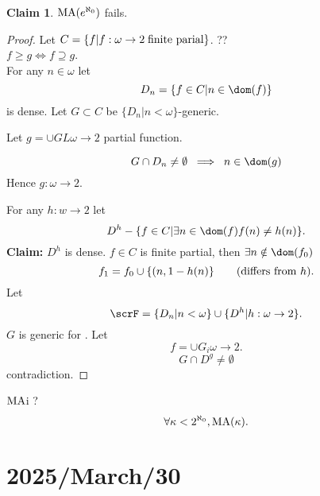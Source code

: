 \documentclass[11pt,pdftex,twoside,a4paper]{article}
\newcommand{\B}[1]{\textbf{#1}}
\newcommand{\MA}{\ensuremath{\mathop{\rm MA}\nolimits}}
\theoremstyle{definition}
\newtheorem{claim}[thm]{Claim}
\begin{document}
\begin{claim}
\(\MA(e^{\aleph_0})\) fails.
\end{claim}
\begin{proof}
Let \(C = \{f| f: \omega \to 2 \;\textnormal{finite parial}\}\). ??
\\
\(f \geq g \iff f \supseteq g\).
\\
For any \(n\in \omega\) let
\begin{equation*}
D_n = \{f\in C| n \in\dom(f)\}
\end{equation*}
is dense.
Let \(G \subset C\)  be  \(\{D_n|n < \omega\}\)-generic.

Let \(g = \cup GL \omega \to 2\) partial function.

\begin{equation*}
 G \cap D_n \neq \emptyset \;\implies\; n \in \dom(g)
\end{equation*}
Hence  \(g:\omega \to 2\).

For any \(h:w\to 2\) let
\begin{equation*}
D^h - \{f\in C| \exists n\in \dom(f) f(n)\neq h(n)\}.
\end{equation*}
\B{Claim:} \(D^h\) is dense.
\(f\in C\) is finite partial, then \(\exists n \notin \dom(f_0)\)
\begin{equation*}
f_1 = f_0 \cup \{(n,1 - h(n)\} \qquad \textnormal{(differs from $h$)}.
\end{equation*}
Let
\begin{equation*}
\scrF = \{D_n | n < \omega\} \cup \{D^h | h : \omega \to 2\}.
\end{equation*}
$G$ is generic for \scrF.
Let
\begin{equation*}
f = \cup G_i \omega \to 2.
\end{equation*}
\begin{equation*}
 G \cap D^g \neq \emptyset
\end{equation*}
contradiction.
\end{proof}

\(\MA\)i ?
\begin{equation*}
\forall \kappa < 2^{\aleph_0}, \MA(\kappa).
\end{equation*}

\section{2025/March/30}
\end{document}
